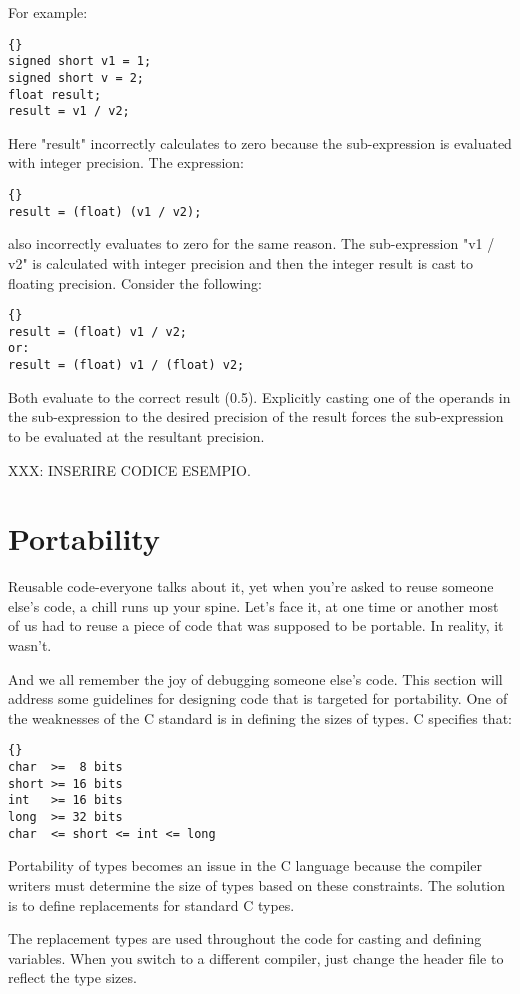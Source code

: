 \documentclass{report}
\begin{document}
For example: 
\begin{lstlisting}{}
signed short v1 = 1;
signed short v = 2;
float result;
result = v1 / v2;        
\end{lstlisting}
Here "result" incorrectly calculates to zero because the sub-expression is evaluated with integer precision. The expression: 
\begin{lstlisting}{}
result = (float) (v1 / v2);
\end{lstlisting}
also incorrectly evaluates to zero for the same reason. The sub-expression "v1 / v2" is calculated with integer precision and then the integer result is cast to floating precision. Consider the following: 
\begin{lstlisting}{}
result = (float) v1 / v2;
or: 
result = (float) v1 / (float) v2;
\end{lstlisting}
Both evaluate to the correct result (0.5). Explicitly casting one of the operands in the sub-expression to the desired precision of the result forces the sub-expression to be evaluated at the resultant precision. 

XXX: INSERIRE CODICE ESEMPIO.
\section{Portability}
Reusable code-everyone talks about it, yet when you're asked to reuse someone else's code, a chill runs up your spine. Let's face it, at one time or another most of us had to reuse a piece of code that was supposed to be portable. In reality, it wasn't. 

And we all remember the joy of debugging someone else's code. This section will address some guidelines for designing code that is targeted for portability. One of the weaknesses of the C standard is in defining the sizes of types. C specifies that: 
\begin{lstlisting}{}
char  >=  8 bits
short >= 16 bits
int   >= 16 bits
long  >= 32 bits
char  <= short <= int <= long
\end{lstlisting}
Portability of types becomes an issue in the C language because the compiler writers must determine the size of types based on these constraints. The solution is to define replacements for standard C types.

The replacement types are used throughout the code for casting and defining variables. 
When you switch to a different compiler, just change the header file to reflect the type sizes. 
\end{document}
